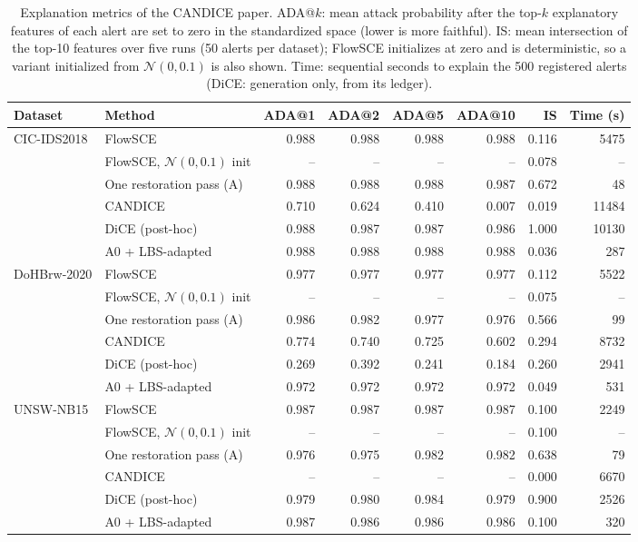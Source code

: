 \begin{table}[t]
\centering\footnotesize
\caption{Explanation metrics of the CANDICE paper. ADA@$k$: mean attack probability after the top-$k$ explanatory features of each alert are set to zero in the standardized space (lower is more faithful). IS: mean intersection of the top-10 features over five runs (50 alerts per dataset); FlowSCE initializes at zero and is deterministic, so a variant initialized from $\mathcal N(0,0.1)$ is also shown. Time: sequential seconds to explain the 500 registered alerts (DiCE: generation only, from its ledger).}
\label{tab:a-candice}
\begin{tabular}{@{}llrrrrrr@{}}
\toprule
Dataset & Method & ADA@1 & ADA@2 & ADA@5 & ADA@10 & IS & Time (s) \\
\midrule
CIC-IDS2018 & FlowSCE & 0.988 & 0.988 & 0.988 & 0.988 & 0.116 & 5475 \\
 & FlowSCE, $\mathcal N(0,0.1)$ init & -- & -- & -- & -- & 0.078 & -- \\
 & One restoration pass (A) & 0.988 & 0.988 & 0.988 & 0.987 & 0.672 & 48 \\
 & CANDICE & 0.710 & 0.624 & 0.410 & 0.007 & 0.019 & 11484 \\
 & DiCE (post-hoc) & 0.988 & 0.987 & 0.987 & 0.986 & 1.000 & 10130 \\
 & A0 + LBS-adapted & 0.988 & 0.988 & 0.988 & 0.988 & 0.036 & 287 \\
\midrule
DoHBrw-2020 & FlowSCE & 0.977 & 0.977 & 0.977 & 0.977 & 0.112 & 5522 \\
 & FlowSCE, $\mathcal N(0,0.1)$ init & -- & -- & -- & -- & 0.075 & -- \\
 & One restoration pass (A) & 0.986 & 0.982 & 0.977 & 0.976 & 0.566 & 99 \\
 & CANDICE & 0.774 & 0.740 & 0.725 & 0.602 & 0.294 & 8732 \\
 & DiCE (post-hoc) & 0.269 & 0.392 & 0.241 & 0.184 & 0.260 & 2941 \\
 & A0 + LBS-adapted & 0.972 & 0.972 & 0.972 & 0.972 & 0.049 & 531 \\
\midrule
UNSW-NB15 & FlowSCE & 0.987 & 0.987 & 0.987 & 0.987 & 0.100 & 2249 \\
 & FlowSCE, $\mathcal N(0,0.1)$ init & -- & -- & -- & -- & 0.100 & -- \\
 & One restoration pass (A) & 0.976 & 0.975 & 0.982 & 0.982 & 0.638 & 79 \\
 & CANDICE & -- & -- & -- & -- & 0.000 & 6670 \\
 & DiCE (post-hoc) & 0.979 & 0.980 & 0.984 & 0.979 & 0.900 & 2526 \\
 & A0 + LBS-adapted & 0.987 & 0.986 & 0.986 & 0.986 & 0.100 & 320 \\
\bottomrule
\end{tabular}
\end{table}

